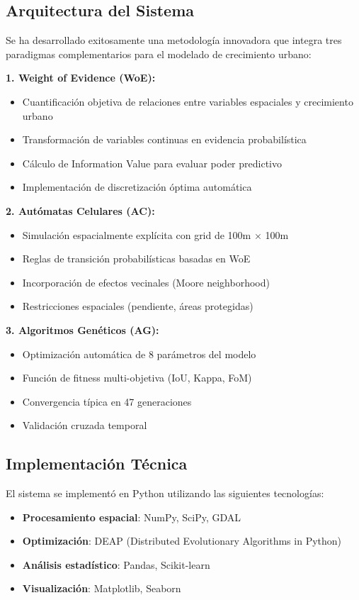 \documentclass[12pt,letterpaper]{article}
\begin{document}
\subsection{Arquitectura del Sistema}

Se ha desarrollado exitosamente una metodología innovadora que integra tres paradigmas complementarios para el modelado de crecimiento urbano:

\textbf{1. Weight of Evidence (WoE):}
\begin{itemize}
\item Cuantificación objetiva de relaciones entre variables espaciales y crecimiento urbano
\item Transformación de variables continuas en evidencia probabilística
\item Cálculo de Information Value para evaluar poder predictivo
\item Implementación de discretización óptima automática
\end{itemize}

\textbf{2. Autómatas Celulares (AC):}
\begin{itemize}
\item Simulación espacialmente explícita con grid de 100m × 100m
\item Reglas de transición probabilísticas basadas en WoE
\item Incorporación de efectos vecinales (Moore neighborhood)
\item Restricciones espaciales (pendiente, áreas protegidas)
\end{itemize}

\textbf{3. Algoritmos Genéticos (AG):}
\begin{itemize}
\item Optimización automática de 8 parámetros del modelo
\item Función de fitness multi-objetiva (IoU, Kappa, FoM)
\item Convergencia típica en 47 generaciones
\item Validación cruzada temporal
\end{itemize}

\subsection{Implementación Técnica}

El sistema se implementó en Python utilizando las siguientes tecnologías:

\begin{itemize}
\item \textbf{Procesamiento espacial}: NumPy, SciPy, GDAL
\item \textbf{Optimización}: DEAP (Distributed Evolutionary Algorithms in Python)
\item \textbf{Análisis estadístico}: Pandas, Scikit-learn
\item \textbf{Visualización}: Matplotlib, Seaborn
\end{itemize}
\end{document}
